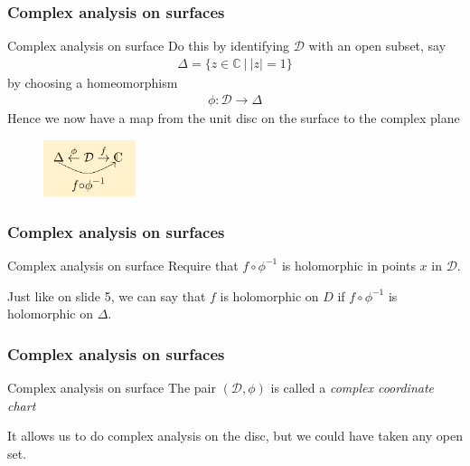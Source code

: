 \documentclass{beamer}[10]
\begin{document}
\begin{frame}
	\frametitle{Complex analysis on surfaces}
	\begin{block}{Complex analysis on surface}
			Do this by identifying $\mathcal{D}$ with an open subset, say
			\begin{equation}
				\begin{aligned}
					\Delta = \{z\in \mathds{C}~\big|~|z|=1\}
				\end{aligned}
			\end{equation}
		by choosing a homeomorphism 
		\begin{equation}
			\begin{aligned}
				\phi:\mathcal{D}\to \Delta
			\end{aligned}
		\end{equation}
	Hence we now have a map from the unit disc on the surface to the complex plane
\begin{figure}\vspace*{-0.3cm}
	\includegraphics[width=2.7cm]{3}
\end{figure}
	\end{block}
\end{frame}

\begin{frame}
	\frametitle{Complex analysis on surfaces}
	\begin{block}{Complex analysis on surface}
	Require that $f\circ \phi^{-1}$ is holomorphic in points $x$ in $\mathcal{D}$.
	
	Just like on slide 5, we can say that $f$ is holomorphic on $D$ if $f\circ \phi^{-1}$ is holomorphic on $\Delta$. 
	
	\end{block}
\end{frame}

\begin{frame}
	\frametitle{Complex analysis on surfaces}
	\begin{block}{Complex analysis on surface}
	The pair $(\mathcal{D},\phi)$ is called a \textit{complex coordinate chart}
	
	It allows us to do complex analysis on the disc, but we could have taken any open set.
	\end{block}
\end{frame}
\end{document}
